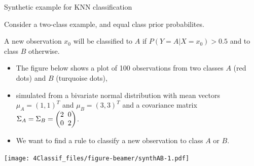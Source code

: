 \documentclass[10pt,ignorenonframetext,]{beamer}
\providecommand{\tightlist}{%
  \setlength{\itemsep}{0pt}\setlength{\parskip}{0pt}}
\begin{document}
\begin{frame}

\begin{block}{Synthetic example for KNN classification}

Consider a two-class example, and equal class prior probabilites.

A new observation \(x_0\) will be classified to \(A\) if
\(P(Y=A | X=x_0) > 0.5\) and to class \(B\) otherwise.

\begin{itemize}
\tightlist
\item
  The figure below shows a plot of 100 observations from two classes
  \(A\) (red dots) and \(B\) (turquoise dots),
\item
  simulated from a bivariate normal distribution with mean vectors
  \(\mu_A = (1, 1)^T\) and \(\mu_B = (3, 3)^T\) and a covariance matrix
  \(\Sigma_A = \Sigma_B = \begin{pmatrix} 2\hspace{2mm} 0 \\ 0 \hspace{2mm} 2 \end{pmatrix}\).
\item
  We want to find a rule to classify a new observation to class \(A\) or
  \(B\).
\end{itemize}

\end{block}

\end{frame}

\begin{frame}

\texttt{[image: 4Classif\_files/figure-beamer/synthAB-1.pdf]}

\end{frame}
\end{document}
